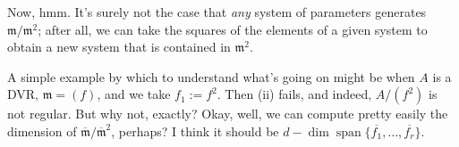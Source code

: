 \documentclass[10pt]{article}
\begin{document}
Now, hmm.  It's surely not the case that \emph{any} system of
parameters generates \(\mathfrak{m}/\mathfrak{m}^2\); after all,
we can take the squares of the elements of a given system to
obtain a new system that is contained in \(\mathfrak{m}^2\).

A simple example by which to understand
what's going on might be when
\(A\) is a DVR, \(\mathfrak{m} = (f)\),
and we take \(f_1 := f^2\).
Then (ii) fails, and indeed, \(A/(f^2)\) is not regular.
But why not, exactly?
Okay, well, we can compute pretty easily
the dimension of \(\overline{\mathfrak{m} } /
  \overline{\mathfrak{m} }^2\), perhaps?
I think it should be \(d - \dim \operatorname{span}
  \{\overline{f_1},\dotsc,\overline{f_r}\}\).


\subsubsection{}
\label{sec:orgdd66e74}
\end{document}
